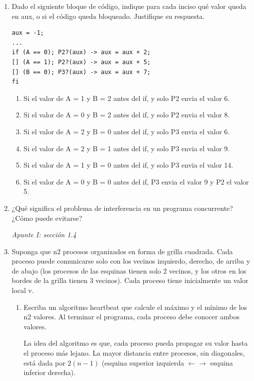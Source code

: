 \documentclass[a4paper, 10pt]{article}
\newenvironment{QandA}{
    \begin{enumerate}\bfseries}
    {\end{enumerate}
}
\newenvironment{answered}{\par\normalfont}{}
\begin{document}
\begin{QandA}
\item Dado el siguiente bloque de código, indique para cada inciso qué valor queda en aux, o si el código queda bloqueado. Justifique su respuesta.

\begin{lstlisting}
aux = -1;
...
if (A == 0); P2?(aux) -> aux = aux + 2;
[] (A == 1); P2?(aux) -> aux = aux + 5;
[] (B == 0); P3?(aux) -> aux = aux + 7;
fi
\end{lstlisting}
\begin{enumerate}
\item Si el valor de A = 1 y B = 2 antes del if, y solo P2 envia el valor 6.
\item Si el valor de A = 0 y B = 2 antes del if, y solo P2 envia el valor 8.
\item Si el valor de A = 2 y B = 0 antes del if, y solo P3 envia el valor 6.
\item Si el valor de A = 2 y B = 1 antes del if, y solo P3 envia el valor 9.
\item Si el valor de A = 1 y B = 0 antes del if, y solo P3 envia el valor 14.
\item Si el valor de A = 0 y B = 0 antes del if, P3 envia el valor 9 y P2 el valor 5.
\end{enumerate}

\item ¿Qué significa el problema de interferencia en un programa concurrente? ¿Cómo puede evitarse? 
\begin{answered}
\emph{Apunte I: sección 1.4}
\end{answered}



\item Suponga que n2 procesos organizados en forma de grilla cuadrada. Cada proceso puede comunicarse solo con los vecinos izquierdo, derecho, de arriba y de abajo (los procesos de las esquinas tienen solo 2 vecinos, y los otros en los bordes de la grilla tienen 3 vecinos). Cada proceso tiene inicialmente un valor local v.
\begin{enumerate}
\item Escriba un algoritmo heartbeat que calcule el máximo y el mínimo de los n2 valores. Al terminar el programa, cada proceso debe conocer ambos valores.
\begin{answered}
La idea del algoritmo es que, cada proceso pueda propagar su valor hasta el proceso más lejano. La mayor distancia entre procesos, sin diagonales, está dada por $2(n-1)$ (esquina superior izquierda $\leftarrow \rightarrow$ esquina inferior derecha).
\end{answered}


\end{enumerate}
\end{QandA}
\end{document}
